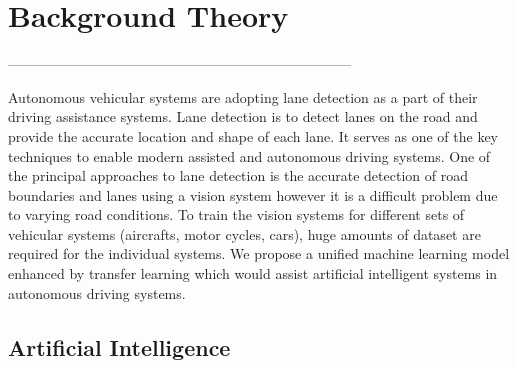 
\chapter{Background Theory} %

\label{Chapter2} %



--------------------------------------------------------------------------

Autonomous vehicular systems are adopting lane detection as a part of their driving assistance systems. Lane detection is to detect lanes on the road and provide the accurate location and shape of each lane. It serves as one of the key techniques to enable modern assisted and autonomous driving systems. One of the principal approaches to lane detection is the accurate detection of road boundaries and lanes using a vision system however it is a difficult problem due to varying road conditions. To train the vision systems for different sets of vehicular systems (aircrafts, motor cycles, cars), huge amounts of dataset are required for the individual systems. We propose a unified machine learning model enhanced by transfer learning which would assist artificial intelligent systems in autonomous driving systems.


\section{Artificial Intelligence}


